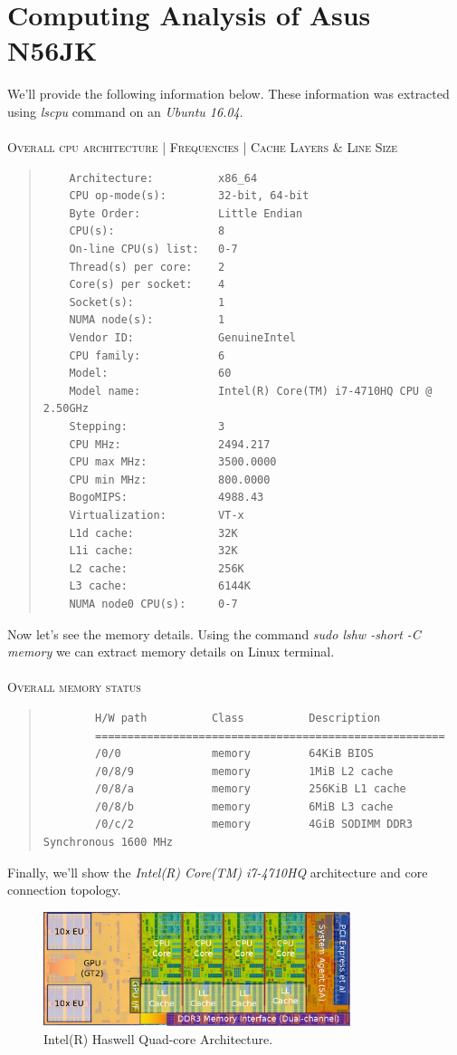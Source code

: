 \documentclass[12pt]{article}
\numberwithin{equation}{section}
\numberwithin{table}{section}
\numberwithin{figure}{section}
\begin{document}
\section{Computing Analysis of Asus N56JK}
We'll provide the following information below. These information was extracted using \textit{lscpu} command on an \textit{Ubuntu 16.04}.\\
\\
\textsc{Overall cpu architecture | Frequencies | Cache Layers \& Line Size}
\begin{quote}
	\begin{verbatim}
	Architecture:          x86_64
	CPU op-mode(s):        32-bit, 64-bit
	Byte Order:            Little Endian
	CPU(s):                8
	On-line CPU(s) list:   0-7
	Thread(s) per core:    2
	Core(s) per socket:    4
	Socket(s):             1
	NUMA node(s):          1
	Vendor ID:             GenuineIntel
	CPU family:            6
	Model:                 60
	Model name:            Intel(R) Core(TM) i7-4710HQ CPU @ 2.50GHz
	Stepping:              3
	CPU MHz:               2494.217
	CPU max MHz:           3500.0000
	CPU min MHz:           800.0000
	BogoMIPS:              4988.43
	Virtualization:        VT-x
	L1d cache:             32K
	L1i cache:             32K
	L2 cache:              256K
	L3 cache:              6144K
	NUMA node0 CPU(s):     0-7
	\end{verbatim}
\end{quote}
Now let's see the memory details. Using the command \textit{sudo lshw -short -C memory} we can extract memory details on Linux terminal.\\
\\
\textsc{Overall memory status}
\begin{quote}
	\begin{verbatim}
		H/W path          Class          Description
		======================================================
		/0/0              memory         64KiB BIOS
		/0/8/9            memory         1MiB L2 cache
		/0/8/a            memory         256KiB L1 cache
		/0/8/b            memory         6MiB L3 cache
		/0/c/2            memory         4GiB SODIMM DDR3 Synchronous 1600 MHz
	\end{verbatim}
\end{quote}
\newpage
Finally, we'll show the \textit{Intel(R) Core(TM) i7-4710HQ} architecture and core connection topology.
\begin{figure}[!h]\centering
	\includegraphics[width=0.8\textwidth]{haswell.png}
	\caption{Intel(R) Haswell Quad-core Architecture.}
	\label{figsolplot}
\end{figure}	
\end{document}
